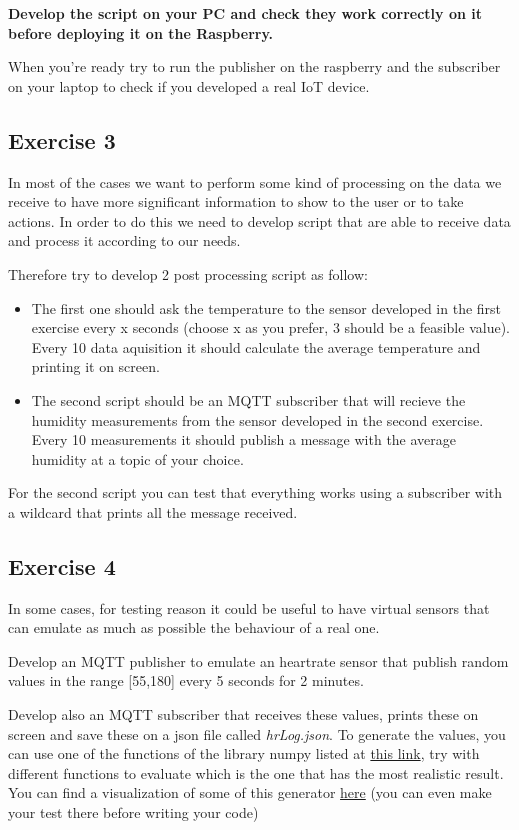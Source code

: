 \documentclass[a4paper]{article}
\begin{document}
\textbf{Develop the script on your PC and check they work correctly on it before
deploying it on the Raspberry.}

When you're ready try to run the publisher on the raspberry and the subscriber
on your laptop to check if you developed a real IoT device.

\subsection{Exercise 3}
\label{sec:org4247f18}

In most of the cases we want to perform some kind of processing on the data we
receive to have more significant information to show to the user or to take
actions. In order to do this we need to develop script that are able to receive
data and process it according to our needs.

Therefore try to develop 2 post processing script as follow:

\begin{itemize}
\item The first one should ask the temperature to the sensor developed in the first
exercise every x seconds (choose x as you prefer, 3 should be a feasible
value). Every 10 data aquisition it should calculate the average temperature
and printing it on screen.
\item The second script should be an MQTT subscriber that will recieve the humidity
measurements from the sensor developed in the second exercise. Every 10
measurements it should publish a message with the average humidity at a topic
of your choice.
\end{itemize}

For the second script you can test that everything works using a subscriber with
a wildcard that prints all the message received.


\subsection{Exercise 4}
\label{sec:org642bb09}

In some cases, for testing reason it could be useful to have virtual sensors
that can emulate as much as possible the behaviour of a real one.

Develop an MQTT publisher to emulate an heartrate sensor that publish
random values in the range [55,180] every 5 seconds for 2 minutes.

Develop also an MQTT subscriber that receives these values, prints these
on screen and save these on a json file called \emph{hrLog.json}. To
generate the values, you can use one of the functions of the library
numpy listed at
\href{https://docs.scipy.org/doc/numpy-1.15.0/reference/routines.random.html}{this
link}, try with different functions to evaluate which is the one that
has the most realistic result. You can find a visualization of some of
this generator
\href{https://colab.research.google.com/drive/1JsxjaRDYnoMb6dQ5MZsLKH7ZDy7QzH9O?usp=sharing}{here}
(you can even make your test there before writing your code)
\end{document}
